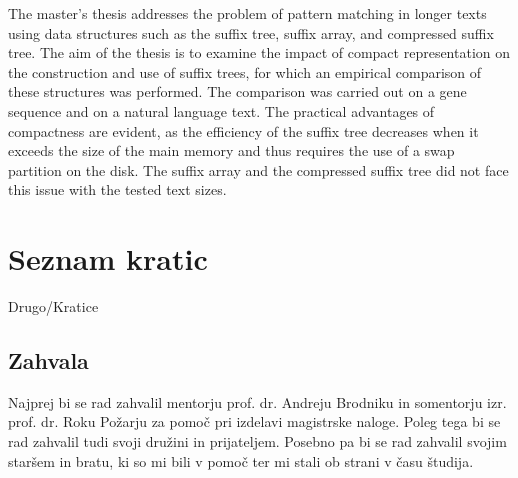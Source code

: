 \documentclass[12pt,a4paper,titlepage,openany,twoside]{report}
\begin{document}
\begin{center}
{{The master's thesis addresses the problem of pattern matching in longer texts using data structures such as the suffix tree, suffix array, and compressed suffix tree. The aim of the thesis is to examine the impact of compact representation on the construction and use of suffix trees, for which an empirical comparison of these structures was performed. The comparison was carried out on a gene sequence and on a natural language text. The practical advantages of compactness are evident, as the efficiency of the suffix tree decreases when it exceeds the size of the main memory and thus requires the use of a swap partition on the disk. The suffix array and the compressed suffix tree did not face this issue with the tested text sizes.%
}}
\end{center}






\newpage

\tableofcontents
{}
\newpage
\listoftables
{}
\newpage
\listoffigures
{}
\newpage

\chapter*{Seznam kratic}
\thispagestyle{fancyplain}
{Drugo/Kratice}
\newpage

\normalsize



\newpage
\section*{\textbf{Zahvala}}

Najprej bi se rad zahvalil mentorju prof. dr. Andreju Brodniku in somentorju izr. prof. dr. Roku Požarju za pomoč pri izdelavi magistrske naloge. Poleg tega bi se rad zahvalil tudi svoji družini in prijateljem. Posebno pa bi se rad zahvalil svojim staršem in bratu, ki so mi bili v pomoč ter mi stali ob strani v času študija.
\end{document}
